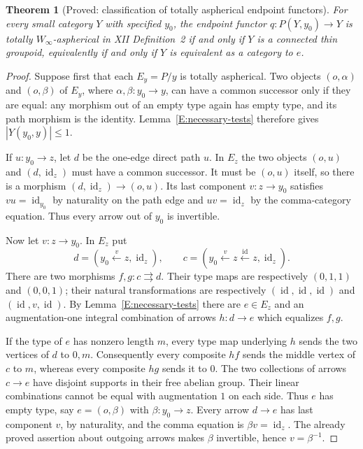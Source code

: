 \documentclass[11pt,a4paper]{article}
\newtheorem{theorem}{Theorem}[section]
\theoremstyle{definition}
\theoremstyle{remark}
\begin{document}
\begin{theorem}[Proved: classification of totally aspherical endpoint functors]
\label{E:total-endpoint}
For every small category $Y$ with specified $y_0$, the endpoint functor
$q:P(Y,y_0)\to Y$ is totally $W_\infty$-aspherical in XII
Definition~2 if and only if $Y$ is a connected thin groupoid, equivalently
if and only if $Y$ is equivalent as a category to $e$.
\end{theorem}
\begin{proof}
Suppose first that each $E_y=P/y$ is totally aspherical.  Two objects
$(o,\alpha)$ and $(o,\beta)$ of $E_y$, where
$\alpha,\beta:y_0\to y$, can have a common successor only if they are
equal: any morphism out of an empty type again has empty type, and its
path morphism is the identity.  Lemma~\ref{E:necessary-tests} therefore
gives $|Y(y_0,y)|\leq1$.

If $u:y_0\to z$, let $d$ be the one-edge direct path $u$.  In $E_z$
the two objects $(o,u)$ and $(d,\operatorname{id}_z)$ must have a common
successor.  It must be $(o,u)$ itself, so there is a morphism
$(d,\operatorname{id}_z)\to(o,u)$.  Its last component $v:z\to y_0$
satisfies $vu=\operatorname{id}_{y_0}$ by naturality on the path edge
and $uv=\operatorname{id}_z$ by the comma-category equation.  Thus every
arrow out of $y_0$ is invertible.

Now let $v:z\to y_0$.  In $E_z$ put
\[
d=(y_0\xleftarrow{v}z,\operatorname{id}_z),\qquad
c=(y_0\xleftarrow{v}z\xleftarrow{\operatorname{id}}z,
\operatorname{id}_z).
\]
There are two morphisms $f,g:c\rightrightarrows d$.
Their type maps are respectively $(0,1,1)$ and $(0,0,1)$; their
natural transformations are respectively
$(\operatorname{id},\operatorname{id},\operatorname{id})$ and
$(\operatorname{id},v,\operatorname{id})$.
By Lemma~\ref{E:necessary-tests} there are $e\in E_z$ and an
augmentation-one integral combination of arrows $h:d\to e$ which
equalizes $f,g$.

If the type of $e$ has nonzero length $m$, every type map underlying
$h$ sends the two vertices of $d$ to $0,m$.  Consequently every
composite $hf$ sends the middle vertex of $c$ to $m$, whereas every
composite $hg$ sends it to $0$.  The two collections of arrows
$c\to e$ have disjoint supports in their free abelian group.  Their
linear combinations cannot be equal with augmentation $1$ on each
side.  Thus $e$ has empty type, say $e=(o,\beta)$ with
$\beta:y_0\to z$.  Every arrow $d\to e$ has last component $v$, by
naturality, and the comma equation is
$\beta v=\operatorname{id}_z$.  The already proved assertion about
outgoing arrows makes $\beta$ invertible, hence $v=\beta^{-1}$.


\end{proof}
\end{document}
